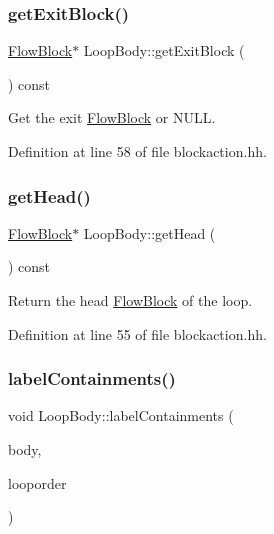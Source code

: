 \subsubsection{\texorpdfstring{getExitBlock()}{getExitBlock()}}
{\footnotesize\ttfamily \mbox{\hyperlink{class_flow_block}{Flow\+Block}}$\ast$ Loop\+Body\+::get\+Exit\+Block (\begin{DoxyParamCaption}\item[{void}]{ }\end{DoxyParamCaption}) const\hspace{0.3cm}{\ttfamily [inline]}}



Get the exit \mbox{\hyperlink{class_flow_block}{Flow\+Block}} or N\+U\+LL. 



Definition at line 58 of file blockaction.\+hh.

\mbox{\label{class_loop_body_a7536eb29312af5840425ad08c34e03b7}} 
\subsubsection{\texorpdfstring{getHead()}{getHead()}}
{\footnotesize\ttfamily \mbox{\hyperlink{class_flow_block}{Flow\+Block}}$\ast$ Loop\+Body\+::get\+Head (\begin{DoxyParamCaption}\item[{void}]{ }\end{DoxyParamCaption}) const\hspace{0.3cm}{\ttfamily [inline]}}



Return the head \mbox{\hyperlink{class_flow_block}{Flow\+Block}} of the loop. 



Definition at line 55 of file blockaction.\+hh.

\mbox{\label{class_loop_body_a86b8806010db2bfe0fc11b41e906278a}} 
\subsubsection{\texorpdfstring{labelContainments()}{labelContainments()}}
{\footnotesize\ttfamily void Loop\+Body\+::label\+Containments (\begin{DoxyParamCaption}\item[{const vector$<$ \mbox{\hyperlink{class_flow_block}{Flow\+Block}} $\ast$ $>$ \&}]{body,  }\item[{const vector$<$ \mbox{\hyperlink{class_loop_body}{Loop\+Body}} $\ast$ $>$ \&}]{looporder }\end{DoxyParamCaption})}



